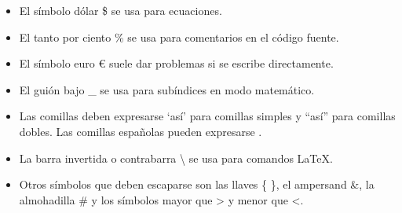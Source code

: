 \begin{itemize}
    \item El símbolo dólar \$ se usa para ecuaciones.
    \item El tanto por ciento \% se usa para comentarios en el código fuente.
    \item El símbolo euro \euro{} suele dar problemas si se escribe directamente.
    \item El guión bajo \_ se usa para subíndices en modo matemático.
    \item Las comillas deben expresarse `así' para comillas simples y ``así'' para comillas dobles. Las comillas españolas pueden expresarse .
    \item La barra invertida o contrabarra \textbackslash{} se usa para comandos LaTeX.
    \item Otros símbolos que deben escaparse son las llaves \{ \}, el ampersand \&, la almohadilla \# y los símbolos mayor que \textgreater{} y menor que \textless{}.
\end{itemize}